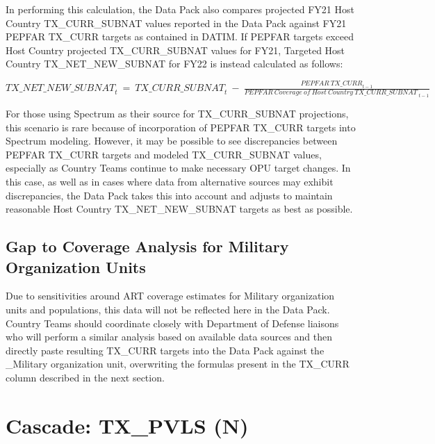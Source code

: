 \documentclass[
  openany]{book}
\begin{document}
In performing this calculation, the Data Pack also compares projected
FY21 Host Country TX\_CURR\_SUBNAT values reported in the Data Pack
against FY21 PEPFAR TX\_CURR targets as contained in DATIM. If PEPFAR
targets exceed Host Country projected TX\_CURR\_SUBNAT values for FY21,
Targeted Host Country TX\_NET\_NEW\_SUBNAT for FY22 is instead calculated
as follows:

\begin{center} ${TX\_ NET\_ NEW\_ SUBNAT}_{t}\  = \ {TX\_ CURR\_ SUBNAT}_{t}\  - \ \frac{{PEPFAR\ TX\_ CURR}_{t - 1}}{{PEPFAR\ Coverage\ of\ Host\ Country\ TX\_ CURR\_ SUBNAT\ }_{t - 1}}$ \end{center}

For those using Spectrum as their source for TX\_CURR\_SUBNAT projections,
this scenario is rare because of incorporation of PEPFAR TX\_CURR targets
into Spectrum modeling. However, it may be possible to see discrepancies
between PEPFAR TX\_CURR targets and modeled TX\_CURR\_SUBNAT values,
especially as Country Teams continue to make necessary OPU target
changes. In this case, as well as in cases where data from alternative
sources may exhibit discrepancies, the Data Pack takes this into account
and adjusts to maintain reasonable Host Country TX\_NET\_NEW\_SUBNAT
targets as best as possible.

\hypertarget{gap-to-coverage-analysis-for-military-organization-units}{%
\subsection{Gap to Coverage Analysis for Military Organization Units}\label{gap-to-coverage-analysis-for-military-organization-units}}

Due to sensitivities around ART coverage estimates for Military
organization units and populations, this data will not be reflected here
in the Data Pack. Country Teams should coordinate closely with
Department of Defense liaisons who will perform a similar analysis based
on available data sources and then directly paste resulting TX\_CURR
targets into the Data Pack against the \_Military organization unit,
overwriting the formulas present in the TX\_CURR column described in the
next section.

\hypertarget{cascade-tx_pvls-n}{%
\section{Cascade: TX\_PVLS (N)}\label{cascade-tx_pvls-n}}
\end{document}
